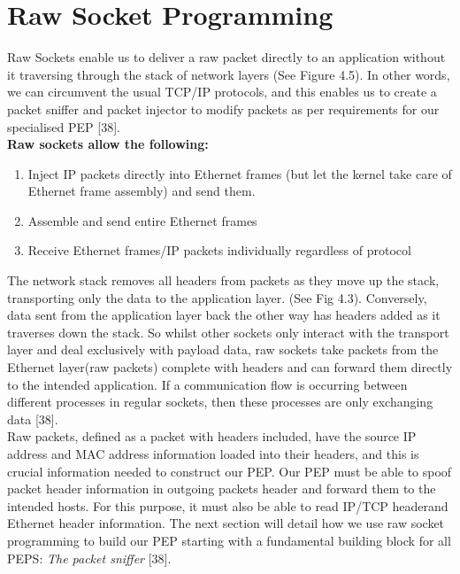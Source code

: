 \documentclass{uathesis}
\begin{document}
\section{Raw Socket Programming}
Raw Sockets enable us to deliver a raw packet directly to an application without it traversing through the stack of network layers (See Figure 4.5).
In other words, we can circumvent the usual TCP/IP protocols, and this enables us to create a packet sniffer and packet injector to modify packets as per requirements for our specialised PEP [38]. \\

\textbf{Raw sockets allow the following:}\\

\begin{enumerate}
\item Inject IP packets directly into Ethernet frames (but let the kernel take care of Ethernet frame assembly) and send them.
\item Assemble and send entire Ethernet frames
\item Receive Ethernet frames/IP packets individually regardless of protocol\\
\end{enumerate}

The network stack removes all headers from packets as they move up the stack, transporting only the data to the application layer. (See Fig 4.3). Conversely, data sent from the application layer back the other way has headers added as it traverses down the stack. So whilst other sockets only interact with the transport layer and deal exclusively with payload data, raw sockets take packets from the Ethernet layer(raw packets) complete with headers and can forward them directly to the intended application. If a communication flow is occurring between different processes in regular sockets, then these processes are only exchanging data [38].\\

Raw packets, defined as a packet with headers included, have the source IP address and MAC address information loaded into their headers, and this is crucial information needed to construct our PEP. Our PEP must be able to spoof packet header information in outgoing packets header and forward them to the intended hosts. For this purpose, it must also be able to read IP/TCP headerand Ethernet header information. The next section will detail how we use raw socket programming to build our PEP starting with a fundamental building block for all PEPS: \emph{The packet sniffer} [38].\\
\end{document}
